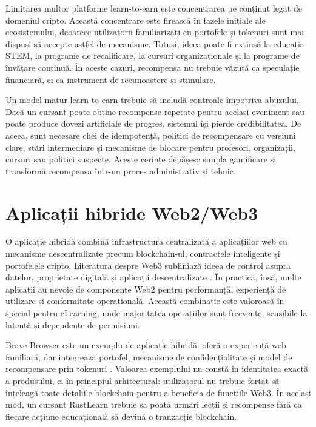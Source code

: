 Limitarea multor platforme learn-to-earn este concentrarea pe conținut legat de domeniul cripto. Această concentrare este firească în fazele inițiale ale ecosistemului, deoarece utilizatorii familiarizați cu portofele și tokenuri sunt mai dispuși să accepte astfel de mecanisme. Totuși, ideea poate fi extinsă la educația STEM, la programe de recalificare, la cursuri organizaționale și la programe de învățare continuă. În aceste cazuri, recompensa nu trebuie văzută ca speculație financiară, ci ca instrument de recunoaștere și stimulare.

Un model matur learn-to-earn trebuie să includă controale împotriva abuzului. Dacă un cursant poate obține recompense repetate pentru același eveniment sau poate produce dovezi artificiale de progres, sistemul își pierde credibilitatea. De aceea, sunt necesare chei de idempotență, politici de recompensare cu versiuni clare, stări intermediare și mecanisme de blocare pentru profesori, organizații, cursuri sau politici suspecte. Aceste cerințe depășesc simpla gamificare și transformă recompensa într-un proces administrativ și tehnic.

\section{Aplicații hibride Web2/Web3}
O aplicație hibridă combină infrastructura centralizată a aplicațiilor web cu mecanisme descentralizate precum blockchain-ul, contractele inteligente și portofelele cripto. Literatura despre Web3 subliniază ideea de control asupra datelor, proprietate digitală și aplicații descentralizate \cite{mdpi2023web3,moralis2024dapps}. În practică, însă, multe aplicații au nevoie de componente Web2 pentru performanță, experiență de utilizare și conformitate operațională. Această combinație este valoroasă în special pentru eLearning, unde majoritatea operațiilor sunt frecvente, sensibile la latență și dependente de permisiuni.

Brave Browser este un exemplu de aplicație hibridă: oferă o experiență web familiară, dar integrează portofel, mecanisme de confidențialitate și model de recompensare prin tokenuri \cite{brave2024wallet,coincodex2024brave}. Valoarea exemplului nu constă în identitatea exactă a produsului, ci în principiul arhitectural: utilizatorul nu trebuie forțat să înțeleagă toate detaliile blockchain pentru a beneficia de funcțiile Web3. În același mod, un cursant RustLearn trebuie să poată urmări lecții și recompense fără ca fiecare acțiune educațională să devină o tranzacție blockchain.

